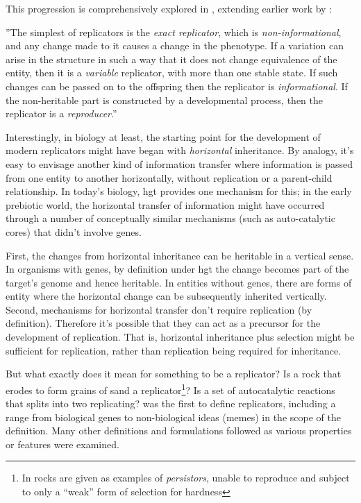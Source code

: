 This progression is comprehensively explored in \textcite{Zachar2010}, extending earlier work by \textcite{Szathmary1999,Szathmary:2006ty}: 

''The simplest of replicators is the \emph{exact replicator}, which is \emph{non-informational}, and any change made to it causes a change in the phenotype. If a variation can arise in the structure in such a way that it does not change equivalence of the entity, then it is a \emph{variable} replicator, with more than one stable state. If such changes can be passed on to the offspring then the replicator is \emph{informational}. If the non-heritable part is constructed by a developmental process, then the replicator is a \emph{reproducer}.'' \parencite[p.21]{Zachar2010}

Interestingly, in biology at least, the starting point for the development of modern replicators might have began with \emph{horizontal} inheritance. By analogy, it’s easy to envisage another kind of information transfer where information is passed from one entity to another horizontally, without replication or a parent-child relationship. In today’s biology, \gls{hgt} provides one mechanism for this; in the early prebiotic world, the horizontal transfer of information might have occurred through a number of conceptually similar mechanisms (such as auto-catalytic cores) that didn’t involve genes. 

First, the changes from horizontal inheritance can be heritable in a vertical sense. In organisms with genes, by definition under \gls{hgt} the change becomes part of the target’s genome and hence heritable. In entities without genes, there are forms of entity where the horizontal change can be subsequently inherited vertically. Second, mechanisms for horizontal transfer don’t require replication (by definition). Therefore it’s possible that they can act as a precursor for the development of replication. That is, horizontal inheritance plus selection might be sufficient for replication, rather than replication being required for inheritance.

But what exactly does it mean for something to be a replicator? Is a rock that erodes to form grains of sand a replicator\footnote{In \textcite{Bourrat2015} rocks are given as examples of \emph{persistors}, unable to reproduce and subject to only a ``weak'' form of selection for hardness}? Is a set of autocatalytic reactions that splits into two replicating? \Textcite{Dawkins1976} was the first to define replicators, including a range from biological genes to non-biological ideas (memes) in the scope of the definition. Many other definitions and formulations followed as various properties or features were examined. 


